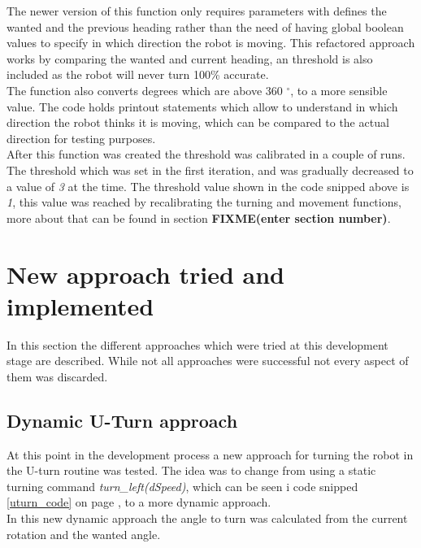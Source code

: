 The newer version of this function only requires parameters with defines the wanted and the previous heading rather than the need of having global boolean values to specify in which direction the robot is moving.
This refactored approach works by comparing the wanted and current heading, an threshold is also included as the robot will never turn 100\% accurate. \\
The function also converts degrees which are above 360 $^{\circ}$, to a more sensible value.
The code holds printout statements which allow to understand in which direction the robot thinks it is moving, which can be compared to the actual direction for testing purposes. \\[3ex]

After this function was created the threshold was calibrated in a couple of runs. The threshold which was set in the first iteration, and was gradually decreased to a value of \textit{3} at the time. The threshold value shown in the code snipped above is \textit{1}, this value was reached by recalibrating the turning and movement functions, more about that can be found in section \textbf{FIXME(enter section number)}.

\section{New approach tried and implemented}
In this section the different approaches which were tried at this development stage are described. While not all approaches were successful not every aspect of them was discarded.

\subsection{Dynamic U-Turn approach}
At this point in the development process a new approach for turning the robot in the U-turn routine was tested. The idea was to change from using a static turning command \textit{turn\_left(dSpeed)}, which can be seen i code snipped \ref{uturn_code} on page \pageref{uturn_code}, to a more dynamic approach. \\
In this new dynamic approach the angle to turn was calculated from the current rotation and the wanted angle.

